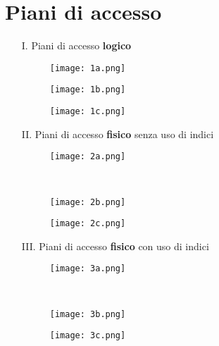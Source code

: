 \section{Piani di accesso}
\begin{enumerate}
	\item[I.] Piani di accesso \textbf{logico}
	\begin{figure}[!h]
		\centering
		\begin{minipage}{.3\textwidth}
			\centering
			\texttt{[image: 1a.png]}
		\end{minipage}
		\begin{minipage}{.3\textwidth}
			\centering
			\texttt{[image: 1b.png]}
		\end{minipage}
		\begin{minipage}{.3\textwidth}
			\centering
			\texttt{[image: 1c.png]}
		\end{minipage}
	\end{figure}
	\newpage
	\item[II.] Piani di accesso \textbf{fisico} senza uso di indici
	\begin{figure}[!h]
		\centering
		\begin{minipage}{.3\textwidth}
			\centering
			\texttt{[image: 2a.png]}
		\end{minipage}\\
		\begin{minipage}{.3\textwidth}
			\centering
			\texttt{[image: 2b.png]}
		\end{minipage}
		\begin{minipage}{.3\textwidth}
			\centering
			\texttt{[image: 2c.png]}
		\end{minipage}
	\end{figure}
	\item[III.] Piani di accesso \textbf{fisico} con uso di indici
	\begin{figure}[!h]
		\centering
		\begin{minipage}{.3\textwidth}
			\centering
			\texttt{[image: 3a.png]}
		\end{minipage}\\
		\begin{minipage}{.3\textwidth}
			\centering
			\texttt{[image: 3b.png]}
		\end{minipage} \hspace{50pt}
		\begin{minipage}{.3\textwidth}
			\centering
			\texttt{[image: 3c.png]}
		\end{minipage}
	\end{figure}
\end{enumerate}